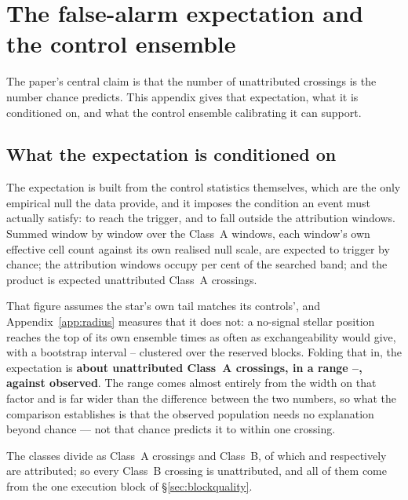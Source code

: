 \section{The false-alarm expectation and the control ensemble}
\label{app:falsealarm}

The paper's central claim is that the number of unattributed crossings is the
number chance predicts. This appendix gives that expectation, what it is
conditioned on, and what the control ensemble calibrating it can support.

\subsection{What the expectation is conditioned on}

The expectation is built from the control statistics themselves, which are
the only empirical null the data provide, and it imposes the condition an
event must actually satisfy: to reach the trigger, and to fall outside the
attribution windows. Summed window by window over the \NWinA{} Class~A
windows, each window's own effective cell count against its own realised null
scale, \RsevChanceTrigA{} are expected to trigger by chance; the attribution
windows occupy \RsevChanceOccPct{} per cent of the searched band; and the
product is \RsevChanceExp{} expected unattributed Class~A crossings.

That figure assumes the star's own tail matches its controls', and
Appendix~\ref{app:radius} measures that it does not: a no-signal stellar
position reaches the top of its own ensemble \HoTailFactor{} times as often
as exchangeability would give, with a bootstrap interval
\HoTailLo--\HoTailHi{} clustered over the reserved blocks. Folding that in,
the expectation is \textbf{about \ChnChanceMid{} unattributed Class~A
crossings, in a range \ChnChanceLo--\ChnChanceHi, against \ChnUnattrA{}
observed}. The range comes almost entirely from the width on that factor and
is far wider than the difference between the two numbers, so what the
comparison establishes is that the observed population needs no explanation
beyond chance --- not that chance predicts it to within one crossing.

The classes divide as \ChnXrossA{} Class~A crossings and \ChnXrossB{}
Class~B, of which \ChnAttrA{} and \ChnAttrB{} respectively are attributed; so
every Class~B crossing is unattributed, and all of them come from the one
execution block of \S\ref{sec:blockquality}.

